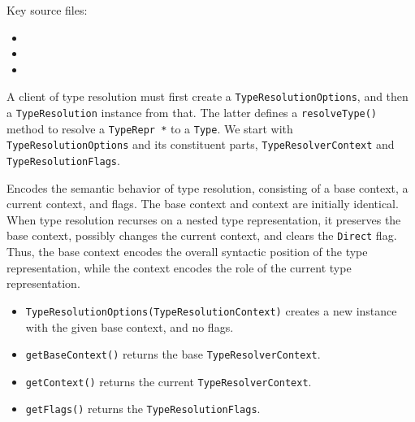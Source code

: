 \documentclass[../generics]{subfiles}
\begin{document}
Key source files:
\begin{itemize}
\item {}
\item {}
\item {}
\end{itemize}

A client of type resolution must first create a \texttt{TypeResolutionOptions}, and then a \texttt{TypeResolution} instance from that. The latter defines a \texttt{resolveType()} method to resolve a \texttt{TypeRepr *} to a \texttt{Type}. We start with \texttt{TypeResolutionOptions} and its constituent parts, \texttt{TypeResolverContext} and \texttt{TypeResolutionFlags}.

Encodes the semantic behavior of type resolution, consisting of a base context, a current context, and flags. The base context and context are initially identical. When type resolution recurses on a nested type representation, it preserves the base context, possibly changes the current context, and clears the \texttt{Direct} flag. Thus, the base context encodes the overall syntactic position of the type representation, while the context encodes the role of the current type representation.
\begin{itemize}
\item \texttt{TypeResolutionOptions(TypeResolutionContext)} creates a new instance with the given base context, and no flags.
\item \texttt{getBaseContext()} returns the base \texttt{TypeResolverContext}.
\item \texttt{getContext()} returns the current \texttt{TypeResolverContext}.
\item \texttt{getFlags()} returns the \texttt{TypeResolutionFlags}.
\end{itemize}
\end{document}
